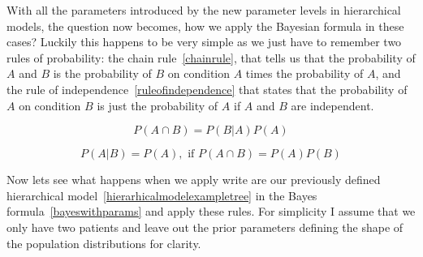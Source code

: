 \documentclass[12pt,a4paper,leqno]{report}
\theoremstyle{plain}
\theoremstyle{definition}
\theoremstyle{remark}
\begin{document}
With all the parameters introduced by the new parameter levels in hierarchical models, the question now becomes, how we apply
the Bayesian formula in these cases? Luckily this happens to be very simple as we just
have to remember two rules of probability: the chain rule\ \ref{chainrule}, that
tells us that the probability of $A$ and $B$ is the probability of $B$ on condition $A$
times the probability of $A$, and the rule of independence\ \ref{ruleofindependence} that states that the
probability of $A$ on condition $B$ is just the probability of $A$ if $A$ and $B$ are independent.

\begin{equation}\label{chainrule}
    P(A \cap B) = P(B|A)P(A)
\end{equation}

\begin{equation}\label{ruleofindependence}
    P(A|B) = P(A), \text{ if } P(A \cap B) = P(A)P(B)
\end{equation}
\smallskip

Now lets see what happens when we apply write are our previously defined hierarchical
model\ \ref{hierarhicalmodelexampletree} in the Bayes formula\
\ref{bayeswithparams} and apply these rules. For simplicity I assume that we only have
two patients and leave out the prior parameters defining the shape of the population
distributions for clarity.
\end{document}
